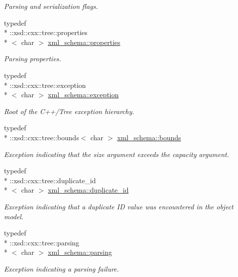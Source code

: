 \begin{DoxyCompactItemize}
\begin{DoxyCompactList}\small\item\em Parsing and serialization flags. \end{DoxyCompactList}\item 
typedef \\*
\-::xsd\-::cxx\-::tree\-::properties\\*
$<$ char $>$ \hyperlink{namespacexml__schema_aba199bc39c8b21c427369c27d2bcfc8c}{xml\-\_\-schema\-::properties}
\begin{DoxyCompactList}\small\item\em Parsing properties. \end{DoxyCompactList}\item 
typedef \\*
\-::xsd\-::cxx\-::tree\-::exception\\*
$<$ char $>$ \hyperlink{namespacexml__schema_a7eb0fa6af3de36ea17011d26a731b62b}{xml\-\_\-schema\-::exception}
\begin{DoxyCompactList}\small\item\em Root of the C++/\-Tree exception hierarchy. \end{DoxyCompactList}\item 
typedef \\*
\-::xsd\-::cxx\-::tree\-::bounds$<$ char $>$ \hyperlink{namespacexml__schema_a00337f2f08dbcb24280f5cf7b96224ea}{xml\-\_\-schema\-::bounds}
\begin{DoxyCompactList}\small\item\em Exception indicating that the size argument exceeds the capacity argument. \end{DoxyCompactList}\item 
typedef \\*
\-::xsd\-::cxx\-::tree\-::duplicate\-\_\-id\\*
$<$ char $>$ \hyperlink{namespacexml__schema_a22a2b3c973b87b06c2868d85a154fd63}{xml\-\_\-schema\-::duplicate\-\_\-id}
\begin{DoxyCompactList}\small\item\em Exception indicating that a duplicate I\-D value was encountered in the object model. \end{DoxyCompactList}\item 
typedef \\*
\-::xsd\-::cxx\-::tree\-::parsing\\*
$<$ char $>$ \hyperlink{namespacexml__schema_a150f88d7d2156ae81807b142038684f5}{xml\-\_\-schema\-::parsing}
\begin{DoxyCompactList}\small\item\em Exception indicating a parsing failure. \end{DoxyCompactList}\item 

\end{DoxyCompactItemize}
